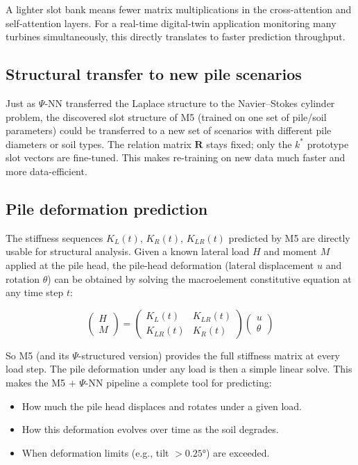\documentclass[11pt,a4paper]{article}
\begin{document}
A lighter slot bank means fewer matrix multiplications in the cross-attention and self-attention layers. For a real-time digital-twin application monitoring many turbines simultaneously, this directly translates to faster prediction throughput.

\subsection{Structural transfer to new pile scenarios}

Just as $\Psi$-NN transferred the Laplace structure to the Navier--Stokes cylinder problem, the discovered slot structure of M5 (trained on one set of pile/soil parameters) could be transferred to a new set of scenarios with different pile diameters or soil types. The relation matrix $\mathbf{R}$ stays fixed; only the $k^*$ prototype slot vectors are fine-tuned. This makes re-training on new data much faster and more data-efficient.

\subsection{Pile deformation prediction}

The stiffness sequences $K_L(t)$, $K_R(t)$, $K_{LR}(t)$ predicted by M5 are directly usable for structural analysis. Given a known lateral load $H$ and moment $M$ applied at the pile head, the pile-head deformation (lateral displacement $u$ and rotation $\theta$) can be obtained by solving the macroelement constitutive equation at any time step $t$:

$$
\begin{pmatrix} H \\ M \end{pmatrix} = \begin{pmatrix} K_L(t) & K_{LR}(t) \\ K_{LR}(t) & K_R(t) \end{pmatrix} \begin{pmatrix} u \\ \theta \end{pmatrix}
$$

So M5 (and its $\Psi$-structured version) provides the full stiffness matrix at every load step. The pile deformation under any load is then a simple linear solve. This makes the M5 $+$ $\Psi$-NN pipeline a complete tool for predicting:
\begin{itemize}[nosep]
    \item How much the pile head displaces and rotates under a given load.
    \item How this deformation evolves over time as the soil degrades.
    \item When deformation limits (e.g., tilt $> 0.25°$) are exceeded.
\end{itemize}
\end{document}
